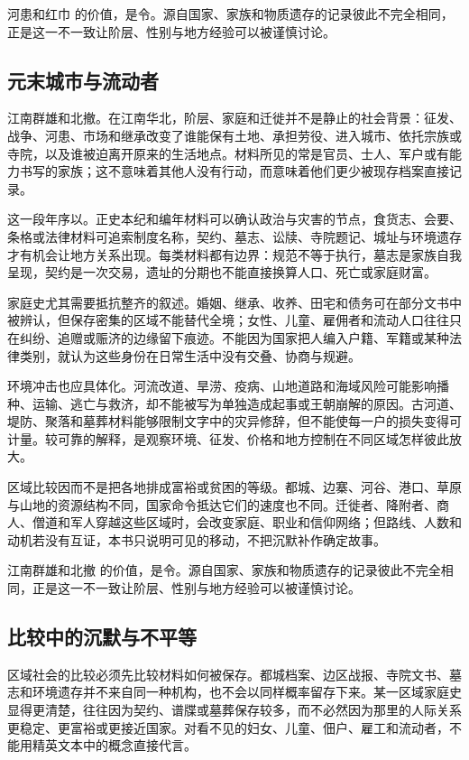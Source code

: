 河患和红巾 的价值，是令。源自国家、家族和物质遗存的记录彼此不完全相同，正是这一不一致让阶层、性别与地方经验可以被谨慎讨论。

\subsection{元末城市与流动者}

江南群雄和北撤。在江南华北，阶层、家庭和迁徙并不是静止的社会背景：征发、战争、河患、市场和继承改变了谁能保有土地、承担劳役、进入城市、依托宗族或寺院，以及谁被迫离开原来的生活地点。材料所见的常是官员、士人、军户或有能力书写的家族；这不意味着其他人没有行动，而意味着他们更少被现存档案直接记录。

这一段年序以。正史本纪和编年材料可以确认政治与灾害的节点，食货志、会要、条格或法律材料可追索制度名称，契约、墓志、讼牍、寺院题记、城址与环境遗存才有机会让地方关系出现。每类材料都有边界：规范不等于执行，墓志是家族自我呈现，契约是一次交易，遗址的分期也不能直接换算人口、死亡或家庭财富。

家庭史尤其需要抵抗整齐的叙述。婚姻、继承、收养、田宅和债务可在部分文书中被辨认，但保存密集的区域不能替代全境；女性、儿童、雇佣者和流动人口往往只在纠纷、追赠或赈济的边缘留下痕迹。不能因为国家把人编入户籍、军籍或某种法律类别，就认为这些身份在日常生活中没有交叠、协商与规避。

环境冲击也应具体化。河流改道、旱涝、疫病、山地道路和海域风险可能影响播种、运输、逃亡与救济，却不能被写为单独造成起事或王朝崩解的原因。古河道、堤防、聚落和墓葬材料能够限制文字中的灾异修辞，但不能使每一户的损失变得可计量。较可靠的解释，是观察环境、征发、价格和地方控制在不同区域怎样彼此放大。

区域比较因而不是把各地排成富裕或贫困的等级。都城、边寨、河谷、港口、草原与山地的资源结构不同，国家命令抵达它们的速度也不同。迁徙者、降附者、商人、僧道和军人穿越这些区域时，会改变家庭、职业和信仰网络；但路线、人数和动机若没有互证，本书只说明可见的移动，不把沉默补作确定故事。

江南群雄和北撤 的价值，是令。源自国家、家族和物质遗存的记录彼此不完全相同，正是这一不一致让阶层、性别与地方经验可以被谨慎讨论。

\subsection{比较中的沉默与不平等}

区域社会的比较必须先比较材料如何被保存。都城档案、边区战报、寺院文书、墓志和环境遗存并不来自同一种机构，也不会以同样概率留存下来。某一区域家庭史显得更清楚，往往因为契约、谱牒或墓葬保存较多，而不必然因为那里的人际关系更稳定、更富裕或更接近国家。对看不见的妇女、儿童、佃户、雇工和流动者，不能用精英文本中的概念直接代言。

